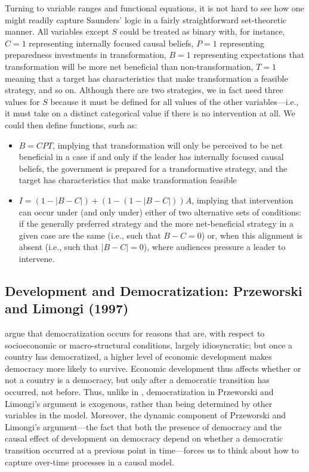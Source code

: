 \documentclass[
  12pt,
]{book}
\providecommand{\tightlist}{%
  \setlength{\itemsep}{0pt}\setlength{\parskip}{0pt}}
\begin{document}
Turning to variable ranges and functional equations, it is not hard to see how one might readily capture Saunders' logic in a fairly straightforward set-theoretic manner. All variables except \(S\) could be treated as binary with, for instance, \(C=1\) representing internally focused causal beliefs, \(P=1\) representing preparedness investments in transformation, \(B=1\) representing expectations that transformation will be more net beneficial than non-transformation, \(T=1\) meaning that a target has characteristics that make transformation a feasible strategy, and so on. Although there are two strategies, we in fact need three values for \(S\) because it must be defined for all values of the other variables---i.e., it must take on a distinct categorical value if there is no intervention at all. We could then define functions, such as:

\begin{itemize}
\tightlist
\item
  \(B=CPT\), implying that transformation will only be perceived to be net beneficial in a case if and only if the leader has internally focused causal beliefs, the government is prepared for a transformative strategy, and the target has characteristics that make transformation feasible
\item
  \(I=(1-|B-C|)+(1-(1-|B-C|))A\), implying that intervention can occur under (and only under) either of two alternative sets of conditions: if the generally preferred strategy and the more net-beneficial strategy in a given case are the same (i.e., such that \(B-C=0\)) or, when this alignment is absent (i.e., such that \(|B-C|=0\)), where audiences pressure a leader to intervene.
\end{itemize}

\hypertarget{development-and-democratization-przeworski-and-limongi-1997}{%
\subsection{Development and Democratization: Przeworski and Limongi (1997)}\label{development-and-democratization-przeworski-and-limongi-1997}}

\citet{przeworski1997modernization} argue that democratization occurs for reasons that are, with respect to socioeconomic or macro-structural conditions, largely idiosyncratic; but once a country has democratized, a higher level of economic development makes democracy more likely to survive. Economic development thus affects whether or not a country is a democracy, but only after a democratic transition has occurred, not before. Thus, unlike in \citet{boix2003democracy}, democratization in Przeworski and Limongi's argument is exogenous, rather than being determined by other variables in the model. Moreover, the dynamic component of Przeworski and Limongi's argument---the fact that both the presence of democracy and the causal effect of development on democracy depend on whether a democratic transition occurred at a previous point in time---forces us to think about how to capture over-time processes in a causal model.
\end{document}
